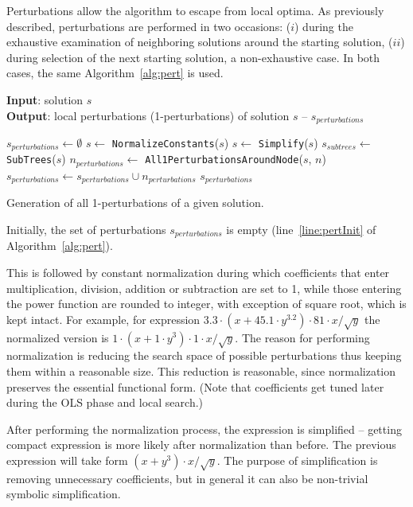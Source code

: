 \documentclass[a4paper,12pt]{elsarticle}
\begin{document}
Perturbations allow the algorithm to escape from local optima. As previously described, perturbations are performed in two occasions: ($i$) during the exhaustive examination of neighboring solutions around the starting solution, ($ii$) during selection of the next starting solution, a non-exhaustive case.  
In both cases, the same Algorithm~\ref{alg:pert} is used. 

\begin{algorithm}
	\hspace*{\algorithmicindent} \textbf{Input}: solution $s$ \\
	\hspace*{\algorithmicindent} \textbf{Output}: local perturbations (1-perturbations) of solution $s$ -- $s_{perturbations}$
	\begin{algorithmic}[1] 
		\State $s_{perturbations} \gets \emptyset$ \label{line:pertInit}
		\State $s \gets$ \texttt{NormalizeConstants}($s$)
		\State $s \gets$ \texttt{Simplify}($s$)
		\State $s_{subtrees} \gets$ \texttt{SubTrees}($s$)
		 \label{line:forSSStart}
		\State $n_{perturbations} \gets$ \texttt{All1PerturbationsAroundNode}($s$, $n$)
		\State $s_{perturbations} \gets s_{perturbations} \cup n_{perturbations}$	
		\EndFor \label{line:forSSEnd}
		\State \Return $s_{perturbations}$
		\EndProcedure
	\end{algorithmic}
	\caption{Generation of all 1-perturbations of a given solution.}
	\label{alg:pert}
\end{algorithm}  

Initially, the set of perturbations $s_{perturbations}$ is empty (line~\ref{line:pertInit} of Algorithm~\ref{alg:pert}).


This is followed by constant normalization during which coefficients that enter multiplication, division, addition or subtraction are set to 1, while those entering the power function are rounded to integer, with exception of square root, which is kept intact. For example, for expression $3.3\cdot(x+45.1\cdot y^{3.2})\cdot 81\cdot x/\sqrt{y}$ the normalized version is $1\cdot (x+1\cdot y^3)\cdot 1\cdot x/\sqrt{y}$. The reason for performing normalization is reducing the search space of possible perturbations thus keeping them within a reasonable size. This reduction is reasonable, since normalization preserves the essential functional form. (Note that coefficients get tuned later during the OLS phase and local search.)


After performing the normalization process, the expression is simplified -- getting compact expression is more likely after normalization than before. The previous expression will take form $(x+y^3)\cdot x/\sqrt{y}$. The purpose of simplification is removing unnecessary coefficients, but in general it can also be non-trivial symbolic simplification. 
\end{document}
